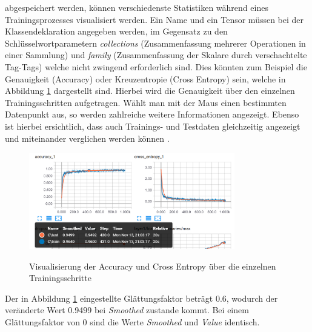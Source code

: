 \vspace{0.2cm}

abgespeichert werden, können verschiedenste Statistiken während eines Trainingsprozesses visualisiert werden. Ein Name und ein Tensor müssen bei der Klassendeklaration angegeben werden, im Gegensatz zu den Schlüsselwortparametern \textit{collections} (Zusammenfassung mehrerer Operationen in einer Sammlung) und \textit{family} (Zusammenfassung der Skalare durch verschachtelte Tag-Tags) welche nicht zwingend erforderlich sind. Dies könnten zum Beispiel die Genauigkeit (Accuracy) oder Kreuzentropie (Cross Entropy) sein, welche in Abbildung \ref{fig:skalare} dargestellt sind. Hierbei wird die Genauigkeit über den einzelnen Trainingsschritten aufgetragen. Wählt man mit der Maus einen bestimmten Datenpunkt aus, so werden zahlreiche weitere Informationen angezeigt. Ebenso ist hierbei ersichtlich, dass auch Trainings- und Testdaten gleichzeitig angezeigt und miteinander verglichen werden können \cite{tensorboard.2017}.

\vspace{0.3cm}
\begin{figure}[h!]
	\centering
	 \includegraphics[width=0.8\textwidth]{images/Kapitel_3/skalars.png}\\
	\vspace{10pt} 
	\caption[Visualisierung der Accuracy und Cross Entropy über die einzelnen Trainingsschritte]{Visualisierung der Accuracy und Cross Entropy über die einzelnen Trainingsschritte}
	\label{fig:skalare}
\end{figure}

Der in Abbildung \ref{fig:skalare} eingestellte Glättungsfaktor beträgt 0.6, wodurch der veränderte Wert 0.9499 bei \textit{Smoothed} zustande kommt. Bei einem Glättungsfaktor von 0 sind die Werte \textit{Smoothed} und \textit{Value} identisch. 



